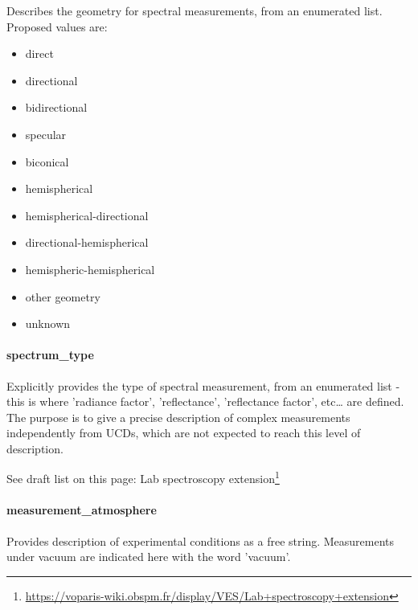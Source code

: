 \documentclass[11pt,a4paper]{ivoa}
\begin{document}
Describes the geometry for spectral measurements, from an enumerated list. Proposed values are:

\begin{itemize}

\item direct

\item directional

\item bidirectional

\item specular

\item biconical

\item hemispherical

\item hemispherical-directional

\item directional-hemispherical

\item hemispheric-hemispherical

\item other geometry

\item unknown

\end{itemize}

\paragraph{spectrum\_type}

Explicitly provides the type of spectral measurement, from an enumerated list - this is where 'radiance factor', 'reflectance', 'reflectance factor', etc… are defined. The purpose is to give a precise description of complex measurements independently from UCDs, which are not expected to reach this level of description.

See draft list on this page: Lab spectroscopy extension\footnote{\url{https://voparis-wiki.obspm.fr/display/VES/Lab+spectroscopy+extension}}

\paragraph{measurement\_atmosphere}

Provides description of experimental conditions as a free string. Measurements under vacuum are indicated here with the word 'vacuum'.
\end{document}
